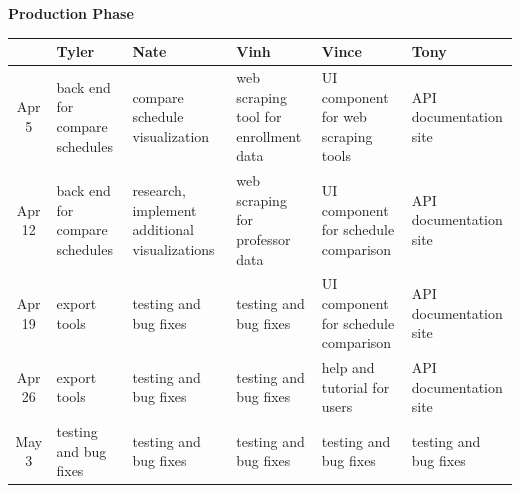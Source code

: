 \documentclass{extarticle}
\begin{document}
\begin{center}
\bf{Production Phase}
\begin{table}[H]
\begin{tabular}{ c || p{3cm} | p{3cm} | p{3cm} | p{3cm} | p{3cm} |}
 & \bf{Tyler} & \bf{Nate} & \bf{Vinh} & \bf{Vince} & \bf{Tony} \\ \hline

Apr 5  & back end for compare schedules & compare schedule visualization & web scraping tool for enrollment data & UI component for web scraping tools & API documentation site \\ \hline

Apr 12 & back end for compare schedules & research, implement additional visualizations & web scraping for professor data & UI component for schedule comparison & API documentation site \\ \hline

Apr 19 & export tools & testing and bug fixes & testing and bug fixes & UI component for schedule comparison & API documentation site \\ \hline

Apr 26 & export tools & testing and bug fixes & testing and bug fixes & help and tutorial for users & API documentation site \\ \hline

May 3  & testing and bug fixes & testing and bug fixes & testing and bug fixes & testing and bug fixes & testing and bug fixes \\ \hline

\end{tabular}
\end{table}
\end{center}

\newpage
\end{document}

